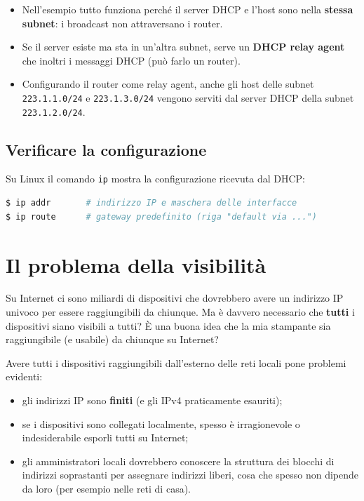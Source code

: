 \begin{itemize}
    \item Nell'esempio tutto funziona perché il server DHCP e l'host sono nella \textbf{stessa subnet}: i broadcast non
          attraversano i router.
    \item Se il server esiste ma sta in un'altra subnet, serve un \textbf{DHCP relay agent} che inoltri i messaggi DHCP (può
          farlo un router).
    \item Configurando il router come relay agent, anche gli host delle subnet \texttt{223.1.1.0/24} e \texttt{223.1.3.0/24}
          vengono serviti dal server DHCP della subnet \texttt{223.1.2.0/24}.
\end{itemize}

\subsection{Verificare la configurazione}

Su Linux il comando \texttt{ip} mostra la configurazione ricevuta dal DHCP:

\begin{lstlisting}[language=bash]
$ ip addr       # indirizzo IP e maschera delle interfacce
$ ip route      # gateway predefinito (riga "default via ...")
\end{lstlisting}

\section{Il problema della visibilità}

Su Internet ci sono miliardi di dispositivi che dovrebbero avere un indirizzo IP univoco per essere raggiungibili da
chiunque. Ma è davvero necessario che \textbf{tutti} i dispositivi siano visibili a tutti? È una buona idea che la mia
stampante sia raggiungibile (e usabile) da chiunque su Internet?

Avere tutti i dispositivi raggiungibili dall'esterno delle reti locali pone problemi evidenti:

\begin{itemize}
    \item gli indirizzi IP sono \textbf{finiti} (e gli IPv4 praticamente esauriti);
    \item se i dispositivi sono collegati localmente, spesso è irragionevole o indesiderabile esporli tutti su Internet;
    \item gli amministratori locali dovrebbero conoscere la struttura dei blocchi di indirizzi soprastanti per assegnare
          indirizzi liberi, cosa che spesso non dipende da loro (per esempio nelle reti di casa).
\end{itemize}

